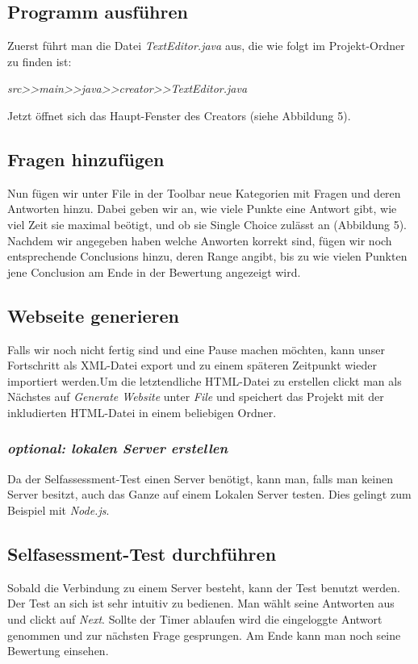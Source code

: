 \label{Anwendungsszenario}
\subsection{Programm ausführen}
Zuerst führt man die Datei \textit{TextEditor.java} aus, die wie folgt im Projekt-Ordner zu finden ist:\newline 

\textit{src>>main>>java>>creator>>TextEditor.java}\newline 

Jetzt öffnet sich das Haupt-Fenster des Creators (siehe Abbildung 5).
\subsection{Fragen hinzufügen}
Nun fügen wir unter File in der Toolbar neue Kategorien mit Fragen und deren Antworten hinzu. Dabei geben wir an, wie viele Punkte eine Antwort gibt, wie viel Zeit sie maximal beötigt, und ob sie Single Choice zulässt an (Abbildung 5). Nachdem wir angegeben haben welche Anworten korrekt sind, fügen wir noch entsprechende Conclusions hinzu, deren Range angibt, bis zu wie vielen Punkten jene Conclusion am Ende in der Bewertung angezeigt wird. 
\subsection{Webseite generieren}
Falls wir noch nicht fertig sind und eine Pause machen möchten, kann unser Fortschritt als XML-Datei export und zu einem späteren Zeitpunkt wieder importiert werden.\newline Um die letztendliche HTML-Datei zu erstellen clickt man als Nächstes auf \textit{Generate Website} unter \textit{File} und speichert das Projekt mit der inkludierten HTML-Datei in einem beliebigen Ordner.
\subsubsection*{\textit{optional: lokalen Server erstellen}}
Da der Selfassessment-Test einen Server benötigt, kann man, falls man keinen Server besitzt, auch das Ganze auf einem Lokalen Server testen. Dies gelingt zum Beispiel mit \textit{Node.js}.
\subsection{Selfasessment-Test durchführen}
Sobald die Verbindung zu einem Server besteht, kann der Test benutzt werden. Der Test an sich ist sehr intuitiv zu bedienen. Man wählt seine Antworten aus und clickt auf \textit{Next}. Sollte der Timer ablaufen wird die eingeloggte Antwort genommen und zur nächsten Frage gesprungen. Am Ende kann man noch seine Bewertung einsehen.